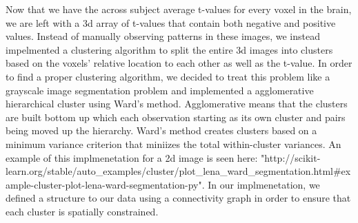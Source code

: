 \par Now that we have the across subject average t-values for every voxel in the brain, we are left with a 3d array of t-values that contain both negative and positive values. Instead of manually observing patterns in these images, we instead impelmented a clustering algorithm to split the entire 3d images into clusters based on the voxels' relative location to each other as well as the t-value. In order to find a proper clustering algorithm, we decided to treat this problem like a grayscale image segmentation problem and implemented a agglomerative hierarchical cluster using Ward's method. Agglomerative means that the clusters are built bottom up which each observation starting as its own cluster and pairs being moved up the hierarchy. Ward's method creates clusters based on a minimum variance criterion that miniizes the total within-cluster variances. An example of this implmenetation for a 2d image is seen here: "http://scikit-learn.org/stable/auto_examples/cluster/plot_lena_ward_segmentation.html#example-cluster-plot-lena-ward-segmentation-py". In our implmenetation, we defined a structure to our data using a connectivity graph in order to ensure that each cluster is spatially constrained. 

\par 